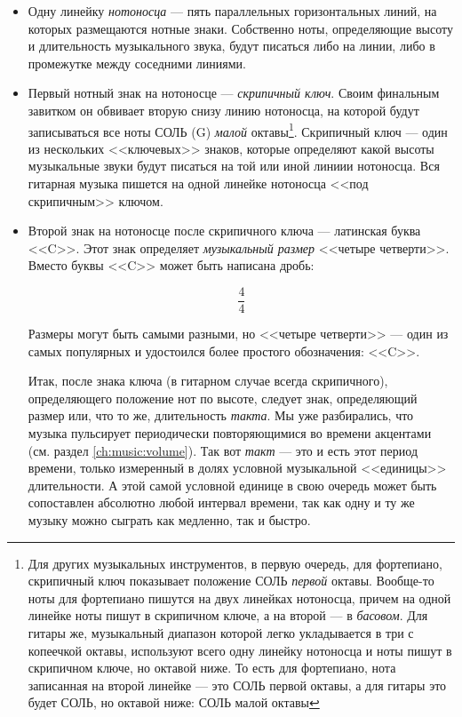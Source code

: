 \begin{itemize}
    \item Одну линейку \emph{нотоносца} --- пять параллельных горизонтальных линий, на которых размещаются нотные знаки. Собственно ноты, определяющие высоту и длительность музыкального звука, будут писаться либо на линии, либо в промежутке между соседними линиями.
    
    \item Первый нотный знак на нотоносце --- \emph{скрипичный ключ}. Своим финальным завитком он обвивает вторую снизу линию нотоносца, на которой будут записываться все ноты СОЛЬ (G) \emph{малой} октавы\footnote{Для других музыкальных инструментов, в первую очередь, для фортепиано, скрипичный ключ показывает положение СОЛЬ \emph{первой} октавы. Вообще-то ноты для фортепиано пишутся на двух линейках нотоносца, причем на одной линейке ноты пишут в скрипичном ключе, а на второй --- в \emph{басовом}. Для гитары же, музыкальный диапазон которой легко укладывается в три с копеечкой октавы, используют всего одну линейку нотоносца и ноты пишут в скрипичном ключе, но октавой ниже. То есть для фортепиано, нота записанная на второй линейке --- это СОЛЬ первой октавы, а для гитары это будет СОЛЬ, но октавой ниже: СОЛЬ малой октавы}. Скрипичный ключ --- один из нескольких <<ключевых>> знаков, которые определяют какой высоты музыкальные звуки будут писаться на той или иной линиии нотоносца. Вся гитарная музыка пишется на одной линейке нотоносца <<под скрипичным>> ключом.
    
    \item Второй знак на нотоносце после скрипичного ключа --- латинская буква <<C>>. Этот знак определяет \emph{музыкальный размер} <<четыре четверти>>. Вместо буквы <<C>> может быть написана дробь:
    
    \[\frac{4}{4}\]
        
    Размеры могут быть самыми разными, но <<четыре четверти>> --- один из самых популярных и удостоился более простого обозначения: <<C>>.
    
    Итак, после знака ключа (в гитарном случае всегда скрипичного), определяющего положение нот по высоте, следует знак, определяющий размер или, что то же, длительность \emph{такта}. Мы уже разбирались, что музыка пульсирует периодически повторяющимися во времени акцентами (см. раздел \ref{ch:music:volume}). Так вот \emph{такт} --- это и есть этот период времени, только измеренный в долях условной музыкальной <<единицы>> длительности. А этой самой условной единице в свою очередь может быть сопоставлен абсолютно любой интервал времени, так как одну и ту же музыку можно сыграть как медленно, так и быстро.
    

\end{itemize}
